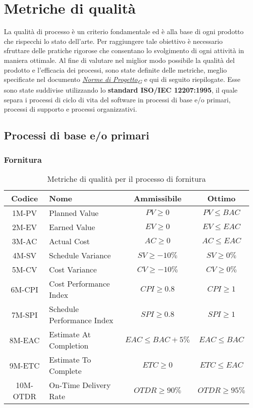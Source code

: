 \section{Metriche di qualità}
La qualità di processo è un criterio fondamentale ed è alla base di ogni prodotto che rispecchi lo stato dell'arte. Per raggiungere tale obiettivo è necessario sfruttare delle pratiche rigorose che consentano lo svolgimento di ogni attività in maniera ottimale. Al fine di valutare nel miglior modo possibile la qualità del prodotto e l'efficacia dei processi, sono state definite delle metriche, meglio specificate nel documento \href{https://7last.github.io/docs/rtb/documentazione-interna/glossario#norme-di-progetto}{\textit{Norme di Progetto\textsubscript{G}}} e qui di seguito riepilogate. Esse sono state suddivise utilizzando lo \textbf{standard ISO/IEC 12207:1995}, il quale separa i processi di ciclo di vita del software in processi di base e/o primari, processi di supporto e processi organizzativi.

\subsection{Processi di base e/o primari}
\subsubsection{Fornitura}
\begin{table}[h!]
	\centering
	\begin{tabular}{ | c | l | c | c | }
		\hline
		Codice   & Nome                       & Ammissibile          & Ottimo           \\
		\hline
		1M-PV    & Planned Value              & $PV \geq 0$          & $PV \leq BAC$    \\
		2M-EV    & Earned Value               & $EV \geq 0$          & $EV \leq EAC$    \\
		3M-AC    & Actual Cost                & $AC \geq 0$          & $AC \leq EAC$    \\
		4M-SV    & Schedule Variance          & $SV \geq -10\%$      & $SV \geq 0\%$    \\
		5M-CV    & Cost Variance              & $CV \geq -10\%$      & $CV \geq 0\%$    \\
		6M-CPI   & Cost Performance Index     & $CPI \geq 0.8$       & $CPI \geq 1$     \\
		7M-SPI   & Schedule Performance Index & $SPI \geq 0.8$       & $SPI \geq 1$     \\
		8M-EAC   & Estimate At Completion     & $EAC \leq BAC + 5\%$ & $EAC \leq BAC$   \\
		9M-ETC   & Estimate To Complete       & $ETC \geq 0$         & $ETC \leq EAC$   \\
		10M-OTDR & On-Time Delivery Rate      & $OTDR \geq 90\%$     & $OTDR \geq 95\%$ \\
		\hline
	\end{tabular}
	\caption{Metriche di qualità per il processo di fornitura}
\end{table}

